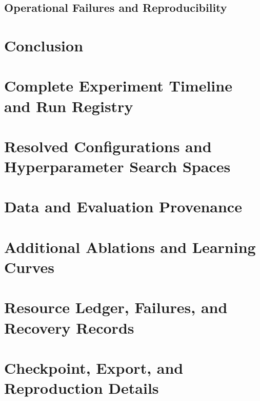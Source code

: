 \subsection{Operational Failures and Reproducibility}

\section{Conclusion}
\label{sec:conclusion}


\appendix
\section{Complete Experiment Timeline and Run Registry}
\section{Resolved Configurations and Hyperparameter Search Spaces}
\section{Data and Evaluation Provenance}
\section{Additional Ablations and Learning Curves}
\section{Resource Ledger, Failures, and Recovery Records}
\section{Checkpoint, Export, and Reproduction Details}

